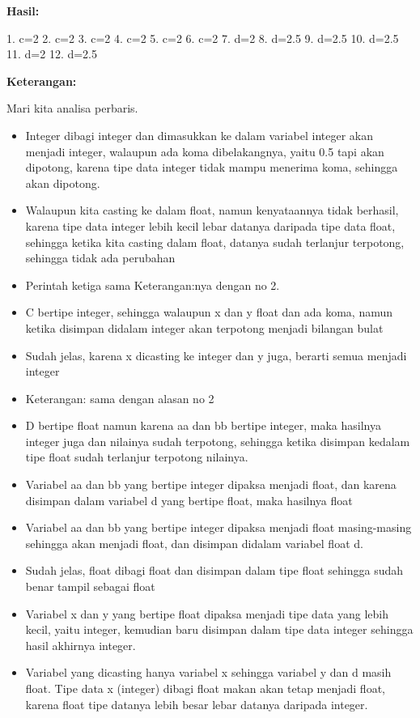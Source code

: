 \textbf{Hasil:}

\begin{lcverbatim}
1. c=2
2. c=2
3. c=2
4. c=2
5. c=2
6. c=2
7. d=2
8. d=2.5
9. d=2.5
10. d=2.5
11. d=2
12. d=2.5
\end{lcverbatim}
\textbf{Keterangan:}

Mari kita analisa perbaris.

\begin{itemize}

\item
Integer dibagi integer dan dimasukkan ke dalam variabel integer akan
menjadi integer, walaupun ada koma dibelakangnya, yaitu 0.5 tapi akan
dipotong, karena tipe data integer tidak mampu menerima koma, sehingga
akan dipotong.
\item
Walaupun kita casting ke dalam float, namun kenyataannya tidak
berhasil, karena tipe data integer lebih kecil lebar datanya daripada
tipe data float, sehingga ketika kita casting dalam float, datanya
sudah terlanjur terpotong, sehingga tidak ada perubahan
\item
Perintah ketiga sama Keterangan:nya dengan no 2.
\item
C bertipe integer, sehingga walaupun x dan y float dan ada koma, namun
ketika disimpan didalam integer akan terpotong menjadi bilangan bulat
\item
Sudah jelas, karena x dicasting ke integer dan y juga, berarti semua
menjadi integer
\item
Keterangan: sama dengan alasan no 2
\item
D bertipe float namun karena aa dan bb bertipe integer, maka hasilnya
integer juga dan nilainya sudah terpotong, sehingga ketika disimpan
kedalam tipe float sudah terlanjur terpotong nilainya.
\item
Variabel aa dan bb yang bertipe integer dipaksa menjadi float, dan
karena disimpan dalam variabel d yang bertipe float, maka hasilnya
float
\item
Variabel aa dan bb yang bertipe integer dipaksa menjadi float
masing-masing sehingga akan menjadi float, dan disimpan didalam
variabel float d.
\item
Sudah jelas, float dibagi float dan disimpan dalam tipe float sehingga
sudah benar tampil sebagai float
\item
Variabel x dan y yang bertipe float dipaksa menjadi tipe data yang
lebih kecil, yaitu integer, kemudian baru disimpan dalam tipe data
integer sehingga hasil akhirnya integer.
\item
Variabel yang dicasting hanya variabel x sehingga variabel y dan d
masih float. Tipe data x (integer) dibagi float makan akan tetap
menjadi float, karena float tipe datanya lebih besar lebar datanya
daripada integer.
\end{itemize}

